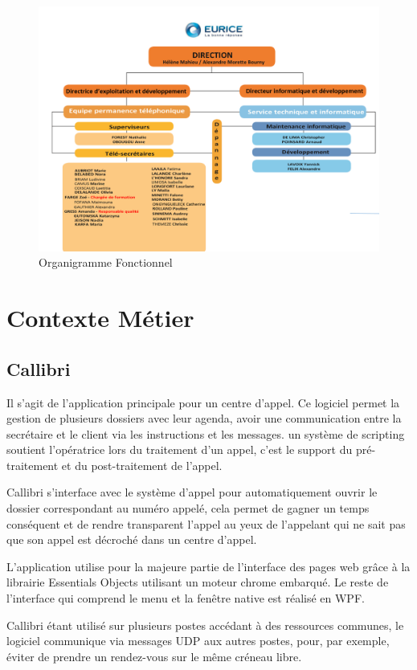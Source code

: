 \begin{figure}[h]
	\centering
	\includegraphics[width=0.7\linewidth]{Images/organigramme_fonctionnel}
	\caption{Organigramme Fonctionnel}
	\label{fig:organigrammefonctionnel}
\end{figure}

\section{Contexte Métier}

\subsection{Callibri}
Il s'agit de l'application principale pour un centre d'appel. 
Ce logiciel permet la gestion de plusieurs dossiers avec leur agenda, 
avoir une communication entre la secrétaire et le client via les instructions et les messages. 
un système de scripting soutient l'opératrice lors du traitement d'un appel, 
c'est le support du pré-traitement et du post-traitement de l'appel. \newline

\gls{Callibri} s'interface avec le système d'appel pour automatiquement ouvrir le dossier correspondant 
au numéro appelé, cela permet de gagner un temps conséquent 
et de rendre transparent l'appel au yeux de l'appelant qui ne sait pas 
que son appel est décroché dans un centre d'appel. \newline


L'application utilise pour la majeure partie de l'interface des pages web grâce 
à la librairie Essentials Objects utilisant un moteur chrome embarqué.
Le reste de l'interface qui comprend le menu et la fenêtre native est réalisé en WPF.
\newline


\gls{Callibri} étant utilisé sur plusieurs postes accédant à des ressources communes, 
le logiciel communique via messages UDP aux autres postes, pour, par exemple, éviter de prendre 
un rendez-vous sur le même créneau libre.

